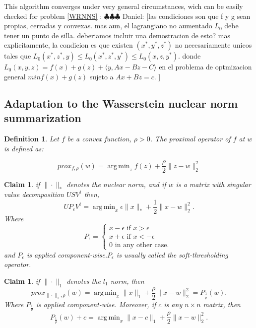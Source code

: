 \documentclass[12pt]{amsart}
\newtheorem{claim}[lemma]{Claim}
\newtheorem{definition}[lemma]{Definition}
\theoremstyle{remark}
\DeclareMathOperator*{\argmin}{arg\,min}
\newcommand{\ddr}[1]{{\color{blue} \sf $\clubsuit\clubsuit\clubsuit$ Daniel: [#1]}}
\begin{document}
This algorithm converges under very general circumstances, wich can be easily checked for problem \ref{WRNNS} :
\ddr{las condiciones son que f y g sean propias, cerradas y convexas. mas aun, el lagrangiano no aumentado $L_0$ debe tener un punto de silla. deberiamos incluir una demostracion de esto? mas explicitamente, la condicion es que 
existen $(x^*,y^*,z^*)$ no necesariamente unicos tales que $L_0(x^*,z^*,y)\leq L_0(x^*,z^*,y^*) \leq L_0(x,z,y^*).$ donde 
$L_0(x,y,z)= f(x)+g(z)+ \langle y, Ax-Bz-C\rangle $ en el problema de optmizacion general $min f(x)+g(z)$ sujeto a $Ax+Bz = c$.
}



\subsection{Adaptation to the Wasserstein nuclear norm summarization}


\begin{definition}
Let $f$ be a convex function, $\rho > 0$. The proximal operator of $f$ at $w$ is defined as:

\[
prox_{f,\rho}(w) = \argmin_{z} f(z)+ \frac{\rho}{2}\|z-w\|_2^2
\]

\end{definition}

\begin{claim}
if $\|\cdot\|_*$ denotes the nuclear norm, and if $w$ is a matrix with singular value decomposition $USV^t$ then,
\[
UP_{\epsilon}V^t = \argmin_x \epsilon\|x\|_* + \frac{1}{2}\|x-w\|_2^2.
\]
Where
\[
P_\epsilon=\begin{cases}
x - \epsilon \text{ if } x>\epsilon \\
x+\epsilon \text{ if }x< -\epsilon\\
0 \text{ in any other case. }
\end{cases}
\]
and $P_\epsilon$ is applied component-wise.$P_\epsilon$ is usually called the soft-thresholding operator.
\end{claim}


\begin{claim}
if $\|\cdot\|_1$ denotes the $l_1$ norm, then
\[
prox_{\|\cdot\|_1,\rho}(w) = \argmin_x \|x\|_1 + \frac{\rho}{2}\|x-w\|_2^2 = P_{\frac{1}{\rho}}(w).
\]
Where $P_{\frac{1}{\rho}}$ is applied component-wise. Moreover, if $c$ is any $n \times n$ matrix, then
\[
P_{\frac{1}{\rho}}(w)+c = \argmin_x \|x-c\|_1+\frac{\rho}{2}\|x-w\|_2^2.
\]

\end{claim}
\end{document}
